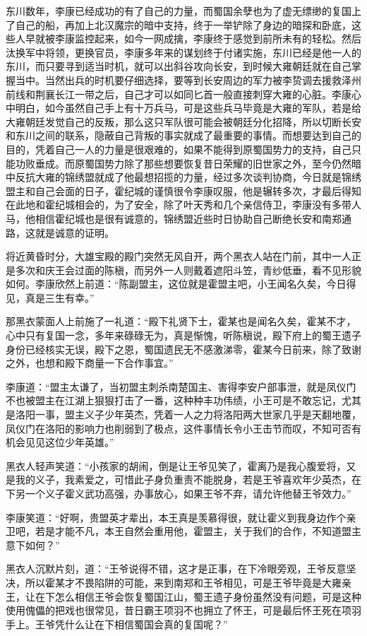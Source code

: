东川数年，李康已经成功的有了自己的力量，而蜀国余孽也为了虚无缥缈的复国上了自己的船，再加上北汉魔宗的暗中支持，终于一举铲除了身边的暗探和卧底，这些人早就被李康监控起来，如今一网成擒，李康终于感觉到前所未有的轻松。然后汰换军中将领，更换官员，李康多年来的谋划终于付诸实施，东川已经是他一人的东川，而只要寻到适当时机，就可以出斜谷攻向长安，到时候大雍朝廷就在自己掌握当中。当然出兵的时机要仔细选择，要等到长安周边的军力被李贽调去援救泽州前线和荆襄长江一带之后，自己才可以如同匕首一般直接刺穿大雍的心脏。李康心中明白，如今虽然自己手上有十万兵马，可是这些兵马毕竟是大雍的军队，若是给大雍朝廷发觉自己的反叛，那么这只军队很可能会被朝廷分化招降，所以切断长安和东川之间的联系，隐蔽自己背叛的事实就成了最重要的事情。而想要达到自己的目的，凭着自己一人的力量是很艰难的，如果不能得到原蜀国势力的支持，自己只能功败垂成。而原蜀国势力除了那些想要恢复昔日荣耀的旧世家之外，至今仍然暗中反抗大雍的锦绣盟就成了他最想招揽的力量，经过多次谈判协商，今日就是锦绣盟主和自己会面的日子，霍纪城的谨慎很令李康叹服，他是辗转多次，才最后得知在此地和霍纪城相会的，为了安全，除了叶天秀和几个亲信侍卫，李康没有多带人马，他相信霍纪城也是很有诚意的，锦绣盟近些时日协助自己断绝长安和南郑通路，这就是诚意的证明。

将近黄昏时分，大雄宝殿的殿门突然无风自开，两个黑衣人站在门前，其中一人正是多次和庆王会过面的陈稹，而另外一人则戴着遮阳斗笠，青纱低垂，看不见形貌如何。李康欣然上前道：“陈副盟主，这位就是霍盟主吧，小王闻名久矣，今日得见，真是三生有幸。”

那黑衣蒙面人上前施了一礼道：“殿下礼贤下士，霍某也是闻名久矣，霍某不才，心中只有复国一念，多年来碌碌无为，真是惭愧，听陈稹说，殿下府上的蜀王遗子身份已经核实无误，殿下之恩，蜀国遗民无不感激涕零，霍某今日前来，除了致谢之外，也想和殿下商量一下合作事宜。”

李康道：“盟主太谦了，当初盟主刺杀南楚国主、害得李安户部事泄，就是凤仪门不也被盟主在江湖上狠狠打击了一番，这种种丰功伟绩，小王可是不敢忘记，尤其是洛阳一事，盟主义子少年英杰，凭着一人之力将洛阳两大世家几乎是天翻地覆，凤仪门在洛阳的影响力也削弱到了极点，这件事情长令小王击节而叹，不知可否有机会见见这位少年英雄。”

黑衣人轻声笑道：“小孩家的胡闹，倒是让王爷见笑了，霍离乃是我心腹爱将，又是我的义子，我素爱之，可惜此子身负重责不能脱身，若是王爷喜欢年少英杰，在下另一个义子霍义武功高强，办事放心，如果王爷不弃，请允许他替王爷效力。”

李康笑道：“好啊，贵盟英才辈出，本王真是羡慕得很，就让霍义到我身边作个亲卫吧，若是才能不凡，本王自然会重用他，霍盟主，关于我们的合作，不知道盟主意下如何？”

黑衣人沉默片刻，道：“王爷说得不错，这才是正事，在下冷眼旁观，王爷反意坚决，所以霍某才不畏陷阱的可能，来到南郑和王爷相见，可是王爷毕竟是大雍亲王，让在下怎么相信王爷会恢复蜀国江山，蜀王遗子身份虽然没有问题，可是这种使用傀儡的把戏也很常见，昔日霸王项羽不也拥立了怀王，可是最后怀王死在项羽手上。王爷凭什么让在下相信蜀国会真的复国呢？”

